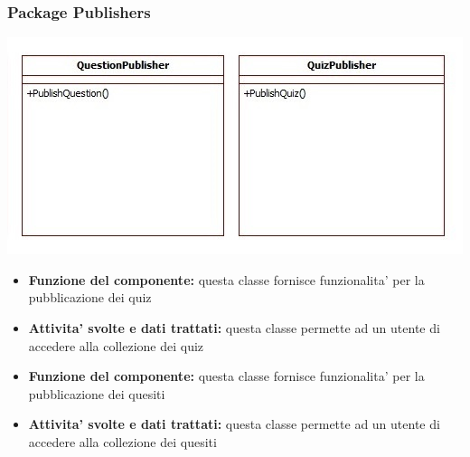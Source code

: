 			\subsubsection{Package Publishers}
			\begin{center}
				\includegraphics[scale=0.9]{../images/Publishers.jpg}
			\end{center}
			\begin{itemize}
				\item\textbf{Funzione del componente:} questa classe fornisce funzionalita' per la pubblicazione dei quiz
				\item\textbf{Attivita' svolte e dati trattati:} questa classe permette ad un utente di accedere alla collezione dei quiz
			\end{itemize}
			\begin{itemize}
				\item\textbf{Funzione del componente:} questa classe fornisce funzionalita' per la pubblicazione dei quesiti
				\item\textbf{Attivita' svolte e dati trattati:} questa classe permette ad un utente di accedere alla collezione dei quesiti
			\end{itemize}